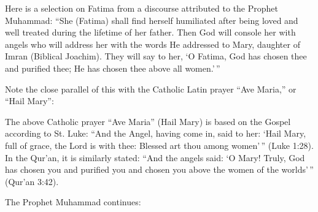 Here is a selection on Fatima from a discourse attributed to the Prophet Muhammad: ``She (Fatima) shall find herself humiliated after being loved and well treated during the lifetime of her father. Then God will console her with angels who will address her with the words He addressed to Mary, daughter of Imran (Biblical Joachim). They will say to her, `O Fatima, God has chosen thee and purified thee; He has chosen thee above all women.'\,''

Note the close parallel of this with the Catholic Latin prayer ``Ave Maria,'' or ``Hail Mary'':



The above Catholic prayer ``Ave Maria'' (Hail Mary) is based on the Gospel according to St. Luke: ``And the Angel, having come in, said to her: `Hail Mary, full of grace, the Lord is with thee: Blessed art thou among women'\,'' (Luke 1:28). In the Qur'an, it is similarly stated: ``And the angels said: `O Mary! Truly, God has chosen you and purified you and chosen you above the women of the worlds'\,'' (Qur'an 3:42).

The Prophet Muhammad continues:

